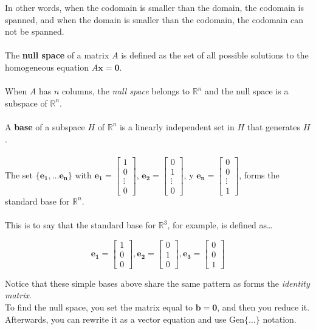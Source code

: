 \documentclass[12pt]{article}
\newcommand{\gen}[1]{\mathrm{Gen}\{{#1}\}}
\newcommand{\R}{\mathbb{R}}
\newcommand{\bm}[1]{\mathbf{{#1}}}
\newcommand{\mb}{\begin{bmatrix}}
\newcommand{\me}{\end{bmatrix}}
\begin{document}
In other words, when the codomain is smaller than the domain, the codomain is spanned, and when the domain is smaller than the codomain, the codomain can not be spanned. \\ \\ 

The \textbf{null space} of a matrix $A$ is defined as the set of all possible solutions to the homogeneous equation $A\bm{x} = \bm{0}$. \\ \\

When $A$ has $n$ columns, the \emph{null space} belongs to $\R^n$ and the null space is a subspace of $\R^n$. \\ \\

A \textbf{base} of a subspace $H$ of $\R^n$ is a linearly independent set in $H$ that generates $H$. \\ \\

The set $\{\bm{e_1,\dots e_n}\}$ with $\bm{e_1} = \mb 1 \\ 0 \\ \vdots \\ 0 \me$, $\bm{e_2} =  \mb 0 \\ 1 \\ \vdots \\ 0 \me$, y $\bm{e_n} =  \mb 0 \\ 0 \\ \vdots \\ 1 \me$,  forms the standard base for $\R^n$. \\ \\

This is to say that the standard base for $\R^3$, for example, is defined as\dots

$$\bm{e_1} = \mb 1\\0\\0 \me, \bm{e_2} = \mb 0\\1\\0 \me, \bm{e_3} = \mb 0\\0\\1 \me $$

Notice that these simple bases above share the same pattern as forms the \emph{identity matrix}. \\

To find the null space, you set the matrix equal to $\bm{b} = \bm{0}$, and then you reduce it.
Afterwards, you can rewrite it as a vector equation and use $\gen{\dots}$ notation. \\ \\
\end{document}

